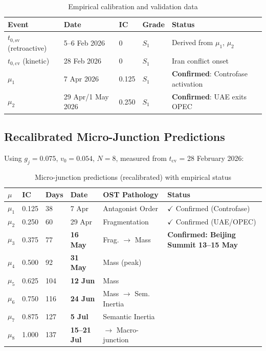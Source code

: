 \documentclass[12pt,a4paper]{article}
\newcommand{\gj}{g_j}
\begin{document}
\begin{table}[H]
\centering
\caption{Empirical calibration and validation data}
\label{tab:calibration}
\begin{tabular}{@{}lllll@{}}
\toprule
\textbf{Event} & \textbf{Date} & \textbf{IC} & \textbf{Grade} & \textbf{Status} \\
\midrule
$t_{0,\mathrm{sv}}$ (retroactive) & 5--6 Feb 2026 & 0 & $S_1$ & Derived from $\mu_1$, $\mu_2$ \\
$t_{0,\mathrm{cv}}$ (kinetic) & 28 Feb 2026 & 0 & $S_1$ & Iran conflict onset \\
$\mu_1$ & 7 Apr 2026 & 0.125 & $S_1$ & \textbf{Confirmed}: Controfase activation \\
$\mu_2$ & 29 Apr/1 May 2026 & 0.250 & $S_1$ & \textbf{Confirmed}: UAE exits OPEC \\
\bottomrule
\end{tabular}
\end{table}

\subsection{Recalibrated Micro-Junction Predictions}\label{subsec:recal_predictions}

Using $\gj = 0.075$, $v_0 = 0.054$, $N = 8$, measured from $t_{\mathrm{cv}}$ = 28 February 2026:

\begin{table}[H]
\centering
\caption{Micro-junction predictions (recalibrated) with empirical status}
\label{tab:micro_recal}
\begin{tabular}{@{}lllllp{3.2cm}@{}}
\toprule
$\mu$ & \textbf{IC} & \textbf{Days} & \textbf{Date} & \textbf{OST Pathology} & \textbf{Status} \\
\midrule
$\mu_1$ & 0.125 & 38 & 7 Apr & Antagonist Order & $\checkmark$ Confirmed (Controfase) \\
$\mu_2$ & 0.250 & 60 & 29 Apr & Fragmentation & $\checkmark$ Confirmed (UAE/OPEC) \\
$\mu_3$ & 0.375 & 77 & \textbf{16 May} & Frag. $\to$ Mass & \textbf{Confirmed: Beijing Summit 13--15 May} \\
$\mu_4$ & 0.500 & 92 & \textbf{31 May} & Mass (peak) & \\
$\mu_5$ & 0.625 & 104 & \textbf{12 Jun} & Mass & \\
$\mu_6$ & 0.750 & 116 & \textbf{24 Jun} & Mass $\to$ Sem. Inertia & \\
$\mu_7$ & 0.875 & 127 & \textbf{5 Jul} & Semantic Inertia & \\
$\mu_8$ & 1.000 & 137 & \textbf{15--21 Jul} & $\to$ Macro-junction & \\
\bottomrule
\end{tabular}
\end{table}
\end{document}
